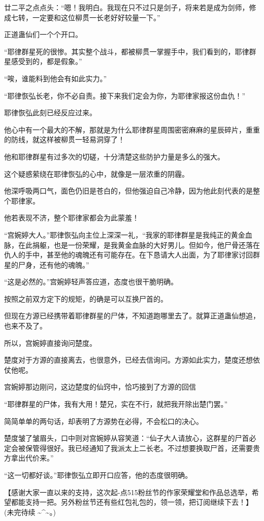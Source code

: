 \begin{this_body}
廿二平之点点头：“嗯！我明白。我现在只不过只是剑子，将来若是成为剑师，修成七转，一定要和这位柳贯一长老好好较量一下。”

正道蛊仙们一个个开口。

“耶律群星死的很惨。其实整个战斗，都被柳贯一掌握手中，我们看到的，耶律群星感受到的，都是假象。”

“唉，谁能料到他会有如此实力。”

“耶律恢弘长老，你不必自责。接下来我们定会为你，为耶律家报这份血仇！”

耶律恢弘此刻已经反应过来。

他心中有一个最大的不解，那就是为什么耶律群星周围密密麻麻的星辰碎片，重重的防线，就这样被柳贯一轻易洞穿了！

他和耶律群星有过多次的切磋，十分清楚这些防护力量是多么的强大。

这个疑惑萦绕在耶律恢弘的心中，就像是一层浓重的阴霾。

他深呼吸两口气，面色仍旧是苍白的，但他强迫自己冷静，因为他此刻代表的是整个耶律家。

他若表现不济，整个耶律家都会为此蒙羞！

“宫婉婷大人。”耶律恢弘向主位上深深一礼，“我家的耶律群星是我纯正的黄金血脉，在此捐躯，也是一份荣耀，是我黄金血脉的大好男儿。但如今，他尸骨还落在仇人的手中，甚至他的魂魄还有可能存在。在下恳请大人出面，为了耶律家讨回群星的尸身，还有他的魂魄。”

“这是必然的。”宫婉婷轻声答应道，态度也很干脆明确。

按照之前双方定下的规矩，的确是可以互换尸首的。

但现在方源已经携带着耶律群星的尸体，不知道跑哪里去了。就算正道蛊仙想追，也来不及了。

所以，宫婉婷直接询问楚度。

楚度对于方源的直接离去，也很意外，已经去信询问。方源如此实力，楚度还想依仗他呢。

宫婉婷那边刚问，这边楚度的仙窍中，恰巧接到了方源的回信

“耶律群星的尸体，我有大用！楚兄，实在不行，就把我开除出楚门罢。”

简简单单的两句话，却表明了方源势在必得，不会松口的决心。

楚度皱了皱眉头，口中则对宫婉婷从容笑道：“仙子大人请放心，这群星的尸首必定会被保管得很好。我已经通知了我派太上二长老。不过想要换取尸首，还需要贵方拿出代价来。”

“这一切都好谈。”耶律恢弘立即开口应答，他的态度很明确。

【感谢大家一直以来的支持，这次起-点515粉丝节的作家荣耀堂和作品总选举，希望都能支持一把。另外粉丝节还有些红包礼包的，领一领，把订阅继续下去！】(未完待续 \~{}\^{}\~{}。)

\end{this_body}

